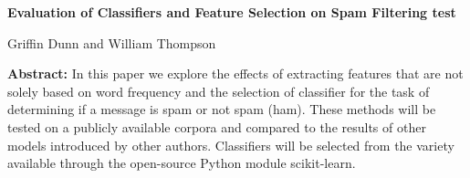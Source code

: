 \documentclass[12pt]{article}
\begin{document}
    \begin{center}
        \textbf{Evaluation of Classifiers and Feature Selection on Spam Filtering test} 
    \end{center}

    \begin{center}
        Griffin Dunn and William Thompson
    \end{center}

    \textbf{Abstract:} 
        In this paper we explore the effects of extracting features that are not 
        solely based on word frequency and the selection of classifier for the task
        of determining if a message is spam or not spam (ham). These methods
        will be tested on a publicly available corpora and compared to the results
        of other models introduced by other authors. Classifiers will be selected
        from the variety available through the open-source Python module scikit-learn.
\end{document}
